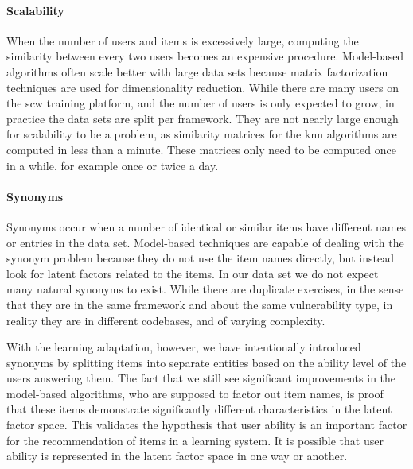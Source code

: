 \paragraph{Scalability}
When the number of users and items is excessively large, computing the similarity between every two users becomes an expensive procedure.
Model-based algorithms often scale better with large data sets because matrix factorization techniques are used for dimensionality reduction.
While there are many users on the \gls{scw} training platform, and the number of users is only expected to grow, in practice the data sets are split per framework.
They are not nearly large enough for scalability to be a problem, as similarity matrices for the \gls{knn} algorithms are computed in less than a minute.
These matrices only need to be computed once in a while, for example once or twice a day.

\paragraph{Synonyms}
Synonyms occur when a number of identical or similar items have different names or entries in the data set.
Model-based techniques are capable of dealing with the synonym problem because they do not use the item names directly, but instead look for latent factors related to the items.
In our data set we do not expect many natural synonyms to exist.
While there are duplicate exercises, in the sense that they are in the same framework and about the same vulnerability type, in reality they are in different codebases, and of varying complexity.

With the learning adaptation, however, we have intentionally introduced synonyms by splitting items into separate entities based on the ability level of the users answering them.
The fact that we still see significant improvements in the model-based algorithms, who are supposed to factor out item names, is proof that these items demonstrate significantly different characteristics in the latent factor space.
This validates the hypothesis that user ability is an important factor for the recommendation of items in a learning system.
It is possible that user ability is represented in the latent factor space in one way or another.

